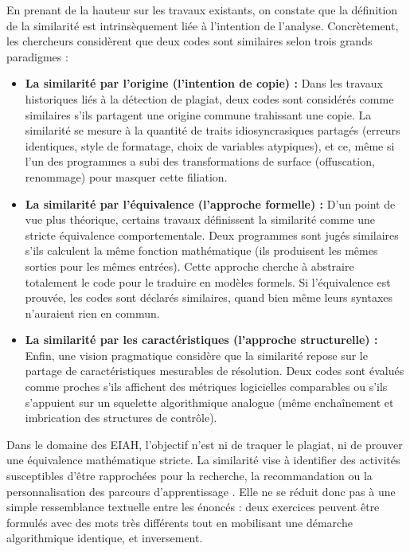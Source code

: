 En prenant de la hauteur sur les travaux existants, on constate que la définition de la similarité est intrinsèquement liée à l'intention de l'analyse. Concrètement, les chercheurs considèrent que deux codes sont similaires selon trois grands paradigmes :

\begin{itemize}
    \item \textbf{La similarité par l'origine (l'intention de copie) :} Dans les travaux historiques liés à la détection de plagiat, deux codes sont considérés comme similaires s'ils partagent une origine commune trahissant une copie. La similarité se mesure à la quantité de traits idiosyncrasiques partagés (erreurs identiques, style de formatage, choix de variables atypiques), et ce, même si l'un des programmes a subi des transformations de surface (offuscation, renommage) pour masquer cette filiation.
    
    \item \textbf{La similarité par l'équivalence (l'approche formelle) :} D'un point de vue plus théorique, certains travaux définissent la similarité comme une stricte équivalence comportementale. Deux programmes sont jugés similaires s'ils calculent la même fonction mathématique (ils produisent les mêmes sorties pour les mêmes entrées). Cette approche cherche à abstraire totalement le code pour le traduire en modèles formels. Si l'équivalence est prouvée, les codes sont déclarés similaires, quand bien même leurs syntaxes n'auraient rien en commun.
    
    \item \textbf{La similarité par les caractéristiques (l'approche structurelle) :} Enfin, une vision pragmatique considère que la similarité repose sur le partage de caractéristiques mesurables de résolution. Deux codes sont évalués comme proches s'ils affichent des métriques logicielles comparables ou s'ils s'appuient sur un squelette algorithmique analogue (même enchaînement et imbrication des structures de contrôle).
\end{itemize}

Dans le domaine des EIAH, l'objectif n'est ni de traquer le plagiat, ni de prouver une équivalence mathématique stricte. La similarité vise à identifier des activités susceptibles d'être rapprochées pour la recherche, la recommandation ou la personnalisation des parcours d'apprentissage \cite{liu_2018,tian_2022}. Elle ne se réduit donc pas à une simple ressemblance textuelle entre les énoncés : deux exercices peuvent être formulés avec des mots très différents tout en mobilisant une démarche algorithmique identique, et inversement.

